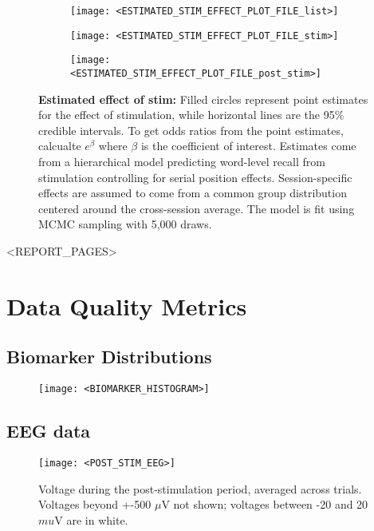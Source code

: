 \begin{figure}[!h]
    \begin{subfigure}[b]{.30\textwidth}
        \texttt{[image: <ESTIMATED\_STIM\_EFFECT\_PLOT\_FILE\_list>]}
    \end{subfigure}\hfill
    \begin{subfigure}[b]{.30\textwidth}
        \texttt{[image: <ESTIMATED\_STIM\_EFFECT\_PLOT\_FILE\_stim>]}
    \end{subfigure}\hfill
    \begin{subfigure}[b]{.30\textwidth}
        \texttt{[image: <ESTIMATED\_STIM\_EFFECT\_PLOT\_FILE\_post\_stim>]}
    \end{subfigure}\hfill
    \caption*{\textbf{Estimated effect of stim:} Filled circles represent point estimates
    for the effect of stimulation, while horizontal lines are the 95\% credible intervals.
    To get odds ratios from the point estimates, calcualte $e^{\beta}$ where $\beta$ is 
    the coefficient of interest. Estimates come from a hierarchical model predicting
    word-level recall from stimulation controlling for serial position effects. 
    Session-specific effects are assumed to come from a common group distribution
    centered around the cross-session average. The model is fit using MCMC sampling
    with 5,000 draws.}
\end{figure}

<REPORT_PAGES>

\clearpage
\section*{Data Quality Metrics}
\subsection*{Biomarker Distributions}
\begin{figure}[!h]
\centering
\texttt{[image: <BIOMARKER\_HISTOGRAM>]}
\end{figure}

\subsection*{EEG data}
\vspace{-1cm}
\begin{figure}[!h]
\centering
\texttt{[image: <POST\_STIM\_EEG>]}
\caption*{Voltage during the post-stimulation period, averaged across trials.\\
          Voltages beyond +-500 $\mu$V not shown; voltages between -20 and 20 $mu$V are in white.}
\end{figure}


